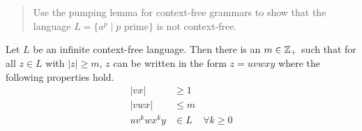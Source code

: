 \documentclass{article}
\begin{document}
\section{}
\begin{quote}
    Use the pumping lemma for context-free grammars to show that the language $L = \{a^p \mid p \text{ prime}\}$ is not context-free.

\end{quote}

\begin{lemma}
    Let $L$ be an infinite context-free language.
    Then there is an $m \in \mathbb{Z}_+$ such that for all $z \in L$ with $\vert z \vert \geq m$, $z$ can be written in the form $z = uvwxy$ where the following properties hold.
    \begin{align*}
        \vert vx \vert  & \geq 1                    \\
        \vert vwx \vert & \leq m                    \\
        u v^k w x^k y   & \in L  & \forall k \geq 0
    \end{align*}
\end{lemma}

\todoinline{\dots}
\end{document}
